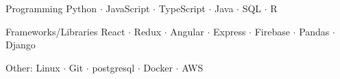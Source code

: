 

\begin{cvskills}

\cvskill
  {Programming} %
  {Python $\cdot$ JavaScript $\cdot$ TypeScript $\cdot$ Java $\cdot$ SQL $\cdot$ R } %

\cvskill
  {Frameworks/Libraries} %
  {React $\cdot$ Redux $\cdot$ Angular $\cdot$ Express $\cdot$ Firebase  $\cdot$ Pandas $\cdot$ Django } %

\cvskill
  {Other:} %
  {Linux $\cdot$ Git $\cdot$ postgresql $\cdot$ Docker $\cdot$ AWS } %





\end{cvskills}
